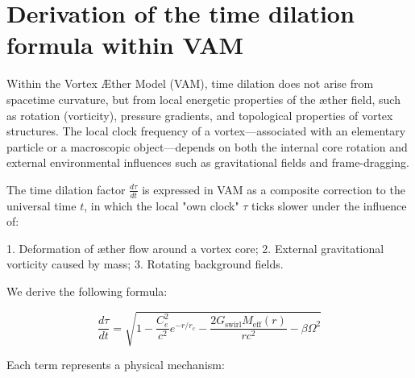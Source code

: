 \section{Derivation of the time dilation formula within VAM}\label{sec:appendix:1}

Within the Vortex Æther Model (VAM), time dilation does not arise from spacetime curvature, but from local energetic properties of the æther field, such as rotation (vorticity), pressure gradients, and topological properties of vortex structures. The local clock frequency of a vortex—associated with an elementary particle or a macroscopic object—depends on both the internal core rotation and external environmental influences such as gravitational fields and frame-dragging.

The time dilation factor $\frac{d\tau}{dt}$ is expressed in VAM as a composite correction to the universal time $t$, in which the local "own clock" $\tau$ ticks slower under the influence of:

1. Deformation of æther flow around a vortex core;
2. External gravitational vorticity caused by mass;
3. Rotating background fields.

We derive the following formula:

\begin{equation}
  \frac{d\tau}{dt} = \sqrt{1 - \frac{C_e^2}{c^2} e^{-r/r_c} - \frac{2G_\text{swirl} M_\text{eff}(r)}{r c^2} - \beta \Omega^2}
\end{equation}

Each term represents a physical mechanism:

